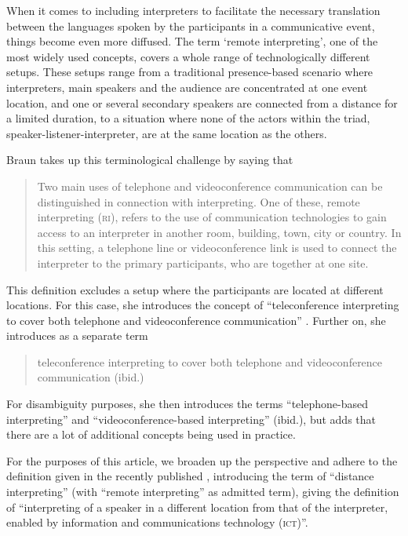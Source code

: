 \documentclass[output=paper]{langsci/langscibook}
\begin{document}
When it comes to including interpreters to facilitate the necessary translation between the languages spoken by the participants in a communicative event, things become even more diffused. The term ‘remote interpreting’, one of the most widely used concepts, covers a whole range of technologically different setups. These setups range from a traditional presence-based scenario where interpreters, main speakers and the audience are concentrated at one event location, and one or several secondary speakers are connected from a distance for a limited duration, to a situation where none of the actors within the triad, speaker-listener-interpreter, are at the same location as the others. 

Braun takes up this terminological challenge by saying that 

\begin{quote}
Two main uses of telephone and videoconference communication can be distinguished in connection with interpreting. One of these, {remote interpreting (\textsc{ri})}, refers to the use of communication technologies to gain access to an interpreter in another room, building, town, city or country. In this setting, a telephone line or videoconference link is used to connect the interpreter to the primary participants, who are together at one site. \citep[1]{Braun2015}
\end{quote}

This definition excludes a setup where the participants are located at different locations. For this case, she introduces the concept of “{teleconference interpreting} to cover both telephone and videoconference communication” \citep[2]{Braun2015}. Further on, she introduces as a separate term

\begin{quote}
	{teleconference interpreting} to cover both telephone and videoconference communication (ibid.)
\end{quote}

For disambiguity purposes, she then introduces the terms “{telephone-based interpreting}” and “{videoconference-based interpreting}” (ibid.), but adds that there are a lot of additional concepts being used in practice.

For the purposes of this article, we broaden up the perspective and adhere to the definition given in the recently published \citeauthor{ISO20108}, introducing the term of ``distance interpreting'' (with ``remote interpreting'' as admitted term), giving the definition of ``interpreting of a speaker in a different location from that of the interpreter, enabled by information and communications technology (\textsc{ict})''. 
\end{document}
